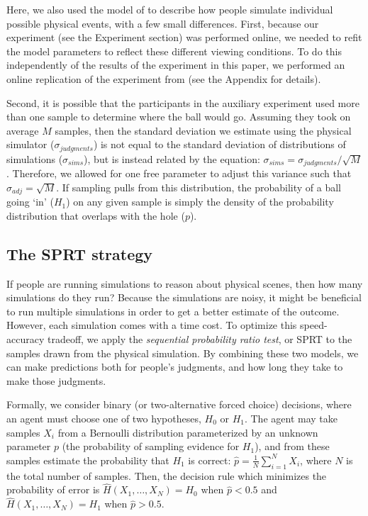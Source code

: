 \documentclass[10pt,letterpaper]{article}
\begin{document}
Here, we also used the model of  to describe how people simulate individual possible physical events, with a few small differences.
First, because our experiment (see the Experiment section) was performed online, we needed to refit the model parameters to reflect these different viewing conditions.
To do this independently of the results of the experiment in this paper, we performed an online replication of the experiment from  (see the Appendix for details).

Second, it is possible that the participants in the auxiliary experiment used more than one sample to determine where the ball would go.
Assuming they took on average $M$ samples, then the standard deviation we estimate using the physical simulator ($\sigma_{judgments}$) is not equal to the standard deviation of distributions of simulations ($\sigma_{sims}$), but is instead related by the equation: $\sigma_{sims} = \sigma_{judgments} / \sqrt{M}$.
Therefore, we allowed for one free parameter to adjust this variance such that $\sigma_{adj}=\sqrt{M}$.
If sampling pulls from this distribution, the probability of a ball going `in' ($H_1$) on any given sample is simply the density of the probability distribution that overlaps with the hole ($p$).

\subsection{The SPRT strategy}

If people are running simulations to reason about physical scenes, then how many simulations do they run?
Because the simulations are noisy, it might be beneficial to run multiple simulations in order to get a better estimate of the outcome.
However, each simulation comes with a time cost.
To optimize this speed-accuracy tradeoff, we apply the \emph{sequential probability ratio test}, or SPRT \cite{wald1947sequential} to the samples drawn from the physical simulation.
By combining these two models, we can make predictions both for people's judgments, and how long they take to make those judgments.

Formally, we consider binary (or two-alternative forced choice) decisions, where an agent must choose one of two hypotheses, $H_0$ or $H_1$. 
The agent may take samples $X_i$ from a Bernoulli distribution parameterized by an unknown parameter $p$ (the probability of sampling evidence for $H_1$), and from these samples estimate the probability that $H_1$ is correct: $\hat{p}=\frac{1}{N}\sum_{i=1}^N X_i$, where $N$ is the total number of samples. 
Then, the decision rule which minimizes the probability of error is $\hat{H}(X_1,\ldots{},X_N)=H_0$ when $\hat{p}<0.5$ and $\hat{H}(X_1,\ldots{},X_N)=H_1$ when $\hat{p}>0.5$.
\end{document}
